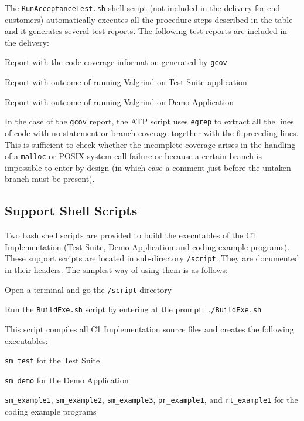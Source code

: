 \documentclass[a4paper,10pt]{article}
\newenvironment{fw_itemize}						%
{\begin{itemize}
  \setlength{\itemsep}{1mm}
  \setlength{\parskip}{0pt}
  \setlength{\parsep}{0pt}}
{\end{itemize}}
\begin{document}
The \texttt{RunAcceptanceTest.sh} shell script (not included in the delivery for end customers) automatically executes all the procedure steps described in the table and it generates several test reports. The following test reports are included in the delivery:

\begin{fw_itemize}
\item Report with the code coverage information generated by \texttt{gcov}
\item Report with outcome of running Valgrind on Test Suite application
\item Report with outcome of running Valgrind on Demo Application
\end{fw_itemize}

In the case of the \texttt{gcov} report, the ATP script uses \texttt{egrep} to extract all the lines of code with no statement or branch coverage together with the 6 preceding lines. This is sufficient to check whether the incomplete coverage arises in the handling of a \texttt{malloc} or POSIX system call failure or because a certain branch is impossible to enter by design (in which case a comment just before the untaken branch must be present).

\subsection{Support Shell Scripts}\label{ref:script}
Two bash shell scripts are provided to build the executables of the C1 Implementation (Test Suite, Demo Application and coding example programs). These support scripts are located in sub-directory \texttt{/script}. They are documented in their headers. The simplest way of using them is as follows:

\begin{fw_itemize}
\item Open a terminal and go the \texttt{/script} directory
\item Run the \texttt{BuildExe.sh} script by entering at the prompt: \texttt{./BuildExe.sh}
\end{fw_itemize}

This script compiles all C1 Implementation source files and creates the following executables:

\begin{fw_itemize}
\item \texttt{sm\_test} for the Test Suite 
\item \texttt{sm\_demo} for the Demo Application
\item \texttt{sm\_example1}, \texttt{sm\_example2}, \texttt{sm\_example3}, \texttt{pr\_example1}, and \texttt{rt\_example1} for the coding example programs
\end{fw_itemize}
\end{document}
